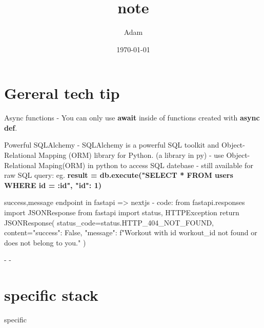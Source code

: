 \documentclass[12pt]{article}
\title{note}
\author{Adam}
\date{\today}
\begin{document}
\maketitle

\section{Gereral tech tip}
\large{Async functions}
- You can only use \textbf{await} inside of functions created with \textbf{async def}.

\large{Powerful SQLAlchemy}
- SQLAlchemy is a powerful SQL toolkit and Object-Relational Mapping (ORM) library for Python. (a library in py)
- use Object-Relational Maping(ORM) in python to access SQL datebase 
- still available for raw SQL query: 
eg.  \textbf{ result = db.execute("SELECT * FROM users WHERE id = :id", {"id": 1}) }

\large{success,message endpoint in fastapi => nextjs}
- code:
from fastapi.responses import JSONResponse
from fastapi import status, HTTPException
return JSONResponse(
    status_code=status.HTTP_404_NOT_FOUND,
    content={"success": False, "message": f"Workout with id {workout_id} not found or does not belong to you."}
)

\large{}
- 
\large{}
- 

\section{specific stack}
specific
\end{document}
